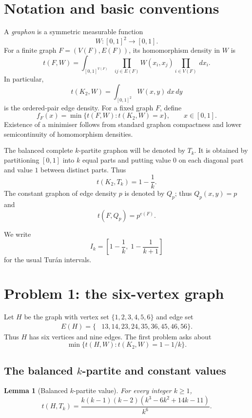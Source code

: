 \documentclass[11pt]{amsart}
\newtheorem{lemma}[theorem]{Lemma}
\theoremstyle{definition}
\newcommand{\1}{\mathbf 1}
\newcommand{\dd}{\,d}
\begin{document}
\section{Notation and basic conventions}
\label{sec:notation}

A \emph{graphon} is a symmetric measurable function
\[
   W:[0,1]^2\to[0,1].
\]
For a finite graph $F=(V(F),E(F))$, its homomorphism density in $W$ is
\[
   t(F,W)=\int_{[0,1]^{V(F)}}\prod_{ij\in E(F)} W(x_i,x_j)\prod_{i\in V(F)}\dd x_i.
\]
In particular,
\[
   t(K_2,W)=\int_{[0,1]^2}W(x,y)\dd x\dd y
\]
is the ordered-pair edge density.  For a fixed graph $F$, define
\[
   f_F(x)=\min\{t(F,W):t(K_2,W)=x\},\qquad x\in[0,1].
\]
Existence of a minimiser follows from standard graphon compactness and lower
semicontinuity of homomorphism densities.

The balanced complete $k$-partite graphon will be denoted by $T_k$.  It is
obtained by partitioning $[0,1]$ into $k$ equal parts and putting value $0$ on
each diagonal part and value $1$ between distinct parts.  Thus
\[
   t(K_2,T_k)=1-\frac1k.
\]
The constant graphon of edge density $p$ is denoted by $Q_p$; thus
$Q_p(x,y)=p$ and
\[
   t(F,Q_p)=p^{e(F)}.
\]

We write
\[
   I_k=\left[1-\frac1k,\;1-\frac1{k+1}\right]
\]
for the usual Tur\'an intervals.

\section{Problem 1: the six-vertex graph}
\label{sec:problem1}

Let $H$ be the graph with vertex set $\{1,2,3,4,5,6\}$ and edge set
\[
\begin{split}
E(H)=\{&13,14,23,24,35,36,45,46,56\}.
\end{split}
\]
Thus $H$ has six vertices and nine edges.  The first problem asks about
\[
   \min\{t(H,W):t(K_2,W)=1-1/k\}.
\]

\subsection{The balanced $k$-partite and constant values}

\begin{lemma}[Balanced $k$-partite value]
For every integer $k\ge 1$,
\[
   t(H,T_k)=\frac{k(k-1)(k-2)(k^3-6k^2+14k-11)}{k^6}.
\]
\end{lemma}
\end{document}
